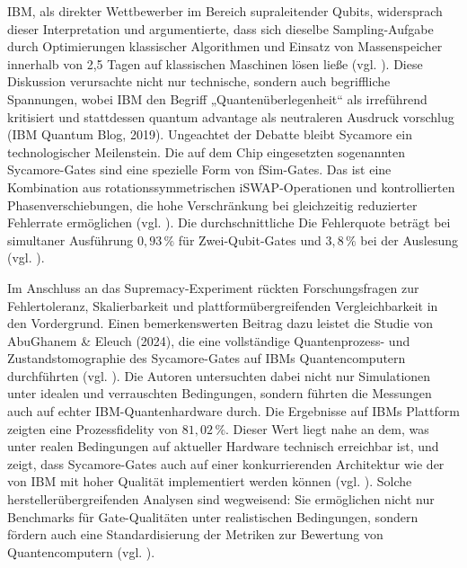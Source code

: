 IBM, als direkter Wettbewerber im Bereich supraleitender Qubits, widersprach dieser Interpretation und argumentierte, dass sich dieselbe Sampling-Aufgabe durch Optimierungen klassischer Algorithmen und Einsatz von Massenspeicher innerhalb von 2,5 Tagen auf klassischen Maschinen lösen ließe (vgl. \cite{pednault_quantum_2019}). Diese Diskussion verursachte nicht nur technische, sondern auch begriffliche Spannungen, wobei IBM den Begriff „Quantenüberlegenheit“ als irreführend kritisiert und stattdessen quantum advantage als neutraleren Ausdruck vorschlug (IBM Quantum Blog, 2019). Ungeachtet der Debatte bleibt Sycamore ein technologischer Meilenstein. Die auf dem Chip eingesetzten sogenannten Sycamore-Gates sind eine spezielle Form von fSim-Gates. Das ist eine Kombination aus rotationssymmetrischen iSWAP-Operationen und kontrollierten Phasenverschiebungen, die hohe Verschränkung bei gleichzeitig reduzierter Fehlerrate ermöglichen (vgl. \cite{abughanemPhotonicQuantumComputers2024}). Die durchschnittliche Die Fehlerquote beträgt bei simultaner Ausführung \(0{,}93\,\%\) für Zwei-Qubit-Gates und \(3{,}8\,\%\) bei der Auslesung (vgl. \cite{arute_quantum_2019}).

\vspace{0.5em}

Im Anschluss an das Supremacy-Experiment rückten Forschungsfragen zur Fehlertoleranz, Skalierbarkeit und plattformübergreifenden Vergleichbarkeit in den Vordergrund. Einen bemerkenswerten Beitrag dazu leistet die Studie von AbuGhanem \& Eleuch (2024), die eine vollständige Quantenprozess- und Zustandstomographie des Sycamore-Gates auf IBMs Quantencomputern durchführten (vgl. \cite{abughanemPhotonicQuantumComputers2024}). Die Autoren untersuchten dabei nicht nur Simulationen unter idealen und verrauschten Bedingungen, sondern führten die Messungen auch auf echter IBM-Quantenhardware durch. Die Ergebnisse auf IBMs Plattform zeigten eine Prozessfidelity von \(81{,}02\,\%\). Dieser Wert liegt nahe an dem, was unter realen Bedingungen auf aktueller Hardware technisch erreichbar ist, und zeigt, dass Sycamore-Gates auch auf einer konkurrierenden Architektur wie der von IBM mit hoher Qualität implementiert werden können (vgl. \cite{abughanem_full_2025}).
Solche herstellerübergreifenden Analysen sind wegweisend: Sie ermöglichen nicht nur Benchmarks für Gate-Qualitäten unter realistischen Bedingungen, sondern fördern auch eine Standardisierung der Metriken zur Bewertung von Quantencomputern (vgl. \cite{abughanemPhotonicQuantumComputers2024}).

